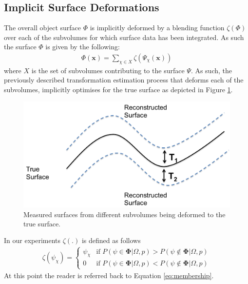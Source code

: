 \subsection{Implicit Surface Deformations}
The overall object surface $\Phi$ is implicitly deformed by a blending function $\zeta(\Phi)$ over each of the subvolumes for which surface data has been integrated.
As such the surface $\Phi$ is given by the following:
\begin{equation}
\begin{split}
\Phi(\mathbf{x}) = \sum_{\chi \in X} \zeta(\Psi_{\chi}(\mathbf{x}))
\end{split}
\end{equation}
where $X$ is the set of subvolumes contributing to the surface $\Psi$. As such, the previously described transformation estimation process that deforms each of the subvolumes, implicitly optimises 
for the true surface as depicted in Figure \ref{fig:deformationDiagram}.
\begin{figure}[!t]
	\centering
	\includegraphics[scale=0.25]{deformation.png}
	\vspace{-3mm}
	\caption{Measured surfaces from different subvolumes being deformed to the true surface.}
	\label{fig:deformationDiagram}
\end{figure}
In our experiments $\zeta (.)$ is defined as follows
\begin{equation}
\begin{split}
\zeta(\psi_{\chi}) = 
\begin{cases}
\psi_{\chi} & \text{if $P(\psi \in \mathbf{\Phi} | \Omega, p) > P(\psi \notin \mathbf{\Phi} | \Omega, p)$} \\
0 & \text{if $P(\psi \in \mathbf{\Phi} | \Omega, p) < P(\psi \notin \mathbf{\Phi} | \Omega, p)$}
\end{cases}
\end{split}
\end{equation}
At this point the reader is referred back to Equation \ref{eq:membership}.

